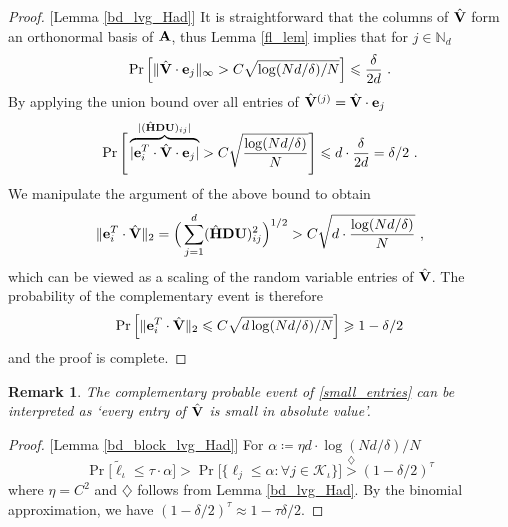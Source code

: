 \documentclass[journal,letterpaper,onecolumn,twoside,nofonttune]{IEEEtran}
\newcommand{\K}{\mathcal{K}}
\newcommand{\Ub}{\bold{U}}
\newcommand{\N}{\mathbb{N}}
\newcommand{\Ab}{\bold{A}}
\newcommand{\Db}{\bold{D}}
\newcommand{\eb}{\bold{e}}
\newcommand{\Hbh}{\hat{\bold{H}}}
\newcommand{\Vbh}{\hat{\bold{V}}}
\newtheorem{Rmk}{Remark}
\begin{document}
\begin{proof}{[Lemma \ref{bd_lvg_Had}]}
It is straightforward that the columns of $\Vbh$ form an orthonormal basis of $\Ab$, thus Lemma \ref{fl_lem} implies that for $j\in\N_d$%
$$ \Pr\left[\|\Vbh\cdot\eb_j\|_\infty> C\sqrt{\log(Nd/\delta)/N}\right] \leqslant \frac{\delta}{2d} \ . $$
By applying the union bound over all entries of $\Vbh^{(j)}=\Vbh\cdot\eb_j$%
\begin{equation}
\label{small_entries}
  \Pr\Bigg[\overbrace{|\eb_i^T\cdot\Vbh\cdot\eb_j|}^{|(\Hbh\Db\Ub)_{ij}|}> C\sqrt{\frac{\log(Nd/\delta)}{N}}\Bigg] \leqslant d\cdot\frac{\delta}{2d} = \delta/2\ .
\end{equation}
We manipulate the argument of the above bound to obtain
$$ \|\eb_i^{T}\cdot\Vbh\|_2=\Big(\sum_{j=1}^d(\Hbh\Db\Ub)_{ij}^2\Big)^{1/2} > { C}\sqrt{d\cdot\frac{\log(Nd/\delta)}{N}} \ , $$
which can be viewed as a scaling of the random variable entries of $\Vbh$. The probability of the complementary event is therefore
$$ \Pr\left[\|\eb_i^T\cdot\Vbh\|_2\leqslant C\sqrt{d\log(Nd/\delta)/N}\right]\geqslant 1-\delta/2 $$
and the proof is complete.
\end{proof}

\begin{Rmk}
The complementary probable event of \eqref{small_entries} can be interpreted as `every entry of $\Vbh$ is small in absolute value'.
\end{Rmk}

\begin{proof}{[Lemma \ref{bd_block_lvg_Had}]}
For $\alpha\coloneqq \eta d\cdot\log(Nd/\delta)/N$
$$ \Pr\big[\tilde{\ell}_\iota\leqslant\tau\cdot\alpha\big]>\Pr\big[\{\ell_j\leqslant\alpha:\forall j\in\K_\iota\}\big]\overset{\diamondsuit}{>}(1-\delta/2)^{\tau}$$
where $\eta=C^2$ and $\diamondsuit$ follows from Lemma \ref{bd_lvg_Had}. By the binomial approximation, we have $(1-\delta/2)^{\tau}\approx 1-\tau\delta/2$.
\end{proof}
\end{document}
